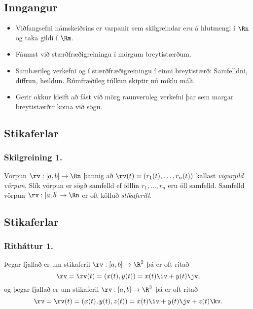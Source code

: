 \date{5.~janúar 2015}



\subsection{}
	\maketitle


\subsection{Inngangur}
\begin {itemize}
 \item Viðfangsefni námskeiðsins er varpanir sem skilgreindar eru á
hlutmengi í $\Rn$ og taka gildi í $\Rm$. 
\item Fáumst við stærðfræðigreiningu í mörgum breytistærðum.
\item Sambærileg verkefni og í stærðfræðigreiningu í einni breytistærð: Samfelldni, diffrun, heildun. Rúmfræðileg túlkun skiptir nú miklu máli.
\item 
Gerir okkur kleift að fást við mörg raunveruleg verkefni þar sem margar breytistærðir koma við sögu.
\end {itemize}




\subsection{Stikaferlar} 

\subsubsection{Skilgreining 1.}
Vörpun $\rv:  [a,b]\rightarrow \Rn$ þannig að $\rv(t)=(r_1(t),\ldots,r_n(t))$ kallast {\em vigurgild vörpun}.  Slík vörpun er sögð samfelld ef föllin $r_1, \ldots, r_n$ eru öll samfelld.  Samfelld vörpun $\rv:  [a,b]\rightarrow \Rn$ er oft kölluð {\em stikaferill}.




\subsection{Stikaferlar}
\subsubsection{Ritháttur 1.}
 Þegar fjallað er um stikaferil $\rv:  [a,b]\rightarrow \R^2$ þá er oft ritað
$$\rv=\rv(t)=(x(t),y(t))=x(t)\iv+y(t)\jv,$$
og þegar fjallað er um stikaferil $\rv:  [a,b]\rightarrow \R^3$ þá er oft ritað
$$\rv=\rv(t)=(x(t),y(t),z(t))=x(t)\iv+y(t)\jv+z(t)\kv.$$



